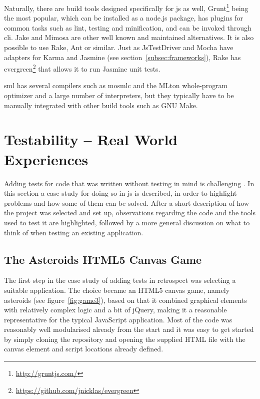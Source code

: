 \documentclass[11pt]{article}
\begin{document}
Naturally, there are build tools designed specifically for \gls{js} as well, Grunt\footnote{\url{http://gruntjs.com/}} being the most popular, which can be installed as a node.js package, has plugins for common tasks such as lint, testing and minification, and can be invoked through \gls{cli}. \cite[question~52]{Edelstam} Jake and Mimosa are other well known and maintained alternatives. It is also possible to use Rake, Ant or similar. Just as JsTestDriver and Mocha have adapters for Karma and Jasmine (see section~\ref{subsec:frameworks}), Rake has evergreen\footnote{\url{https://github.com/jnicklas/evergreen}} that allows it to run Jasmine unit tests. \cite{BuildTools}\cite[question~6]{Ahnve}

\Gls{sml} has several compilers such as mosmlc and the MLton whole-program optimizer and a large number of interpreters, but they typically have to be manually integrated with other build tools such as GNU Make.


\section{Testability -- Real World Experiences}
\label{sec:testability}

Adding tests for code that was written without testing in mind is challenging \cite[p.~18]{Tddjs}. In this section a case study for doing so in \gls{js} is described, in order to highlight problems and how some of them can be solved. After a short description of how the project was selected and set up, observations regarding the code and the tools used to test it are highlighted, followed by a more general discussion on what to think of when testing an existing application.

\subsection{The Asteroids HTML5 Canvas Game}
\label{subsec:asteriods}

The first step in the case study of adding tests in retrospect was selecting a suitable application. The choice became an HTML5 canvas game, namely asteroids (see figure~\ref{fig:game3}), based on that it combined graphical elements with relatively complex logic and a bit of jQuery, making it a reasonable representative for the typical JavaScript application. Most of the code was reasonably well modularised already from the start and it was easy to get started by simply cloning the repository and opening the supplied HTML file with the canvas element and script locations already defined.
\end{document}
